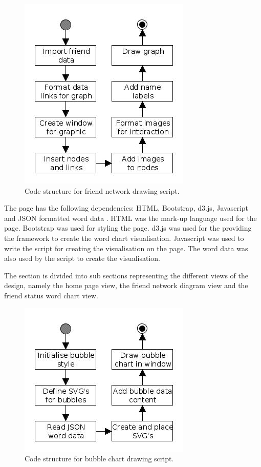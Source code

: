 \documentclass[12pt,onecolumn]{article}
\begin{document}
		\begin{figure}[h]
			\centering
			\includegraphics[scale=1]{network}
			\caption{Code structure for friend network drawing script.} \label{fig:networkdiagram}
		\end{figure}
		
	The page has the following dependencies: HTML, Bootstrap, d3.js, Javascript and JSON formatted word data \cite{HTML, Bootstrap, D3, js, JSON}. HTML was the mark-up language used for the page. Bootstrap was used for styling the page. d3.js was used for the providing the framework to create the word chart visualisation. Javascript was used to write the script for creating the visualisation on the page. The word data was also used by the script to create the visualisation.

	The section is divided into sub sections representing the different views of the design, namely the home page view, the friend network diagram view and the friend status word chart view.
	\begin{figure}[h]
		\centering
		\includegraphics[scale=1]{bubbles}
		\caption{Code structure for bubble chart drawing script.}
	\end{figure}
	
\end{document}
